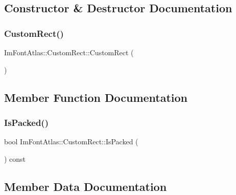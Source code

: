 \subsection{Constructor \& Destructor Documentation}
\hypertarget{struct_im_font_atlas_1_1_custom_rect_abee2845214da5ffc9c77bb388402a0a9}{}\label{struct_im_font_atlas_1_1_custom_rect_abee2845214da5ffc9c77bb388402a0a9} 
\subsubsection{\texorpdfstring{Custom\+Rect()}{CustomRect()}}
{\footnotesize\ttfamily Im\+Font\+Atlas\+::\+Custom\+Rect\+::\+Custom\+Rect (\begin{DoxyParamCaption}{ }\end{DoxyParamCaption})}



\subsection{Member Function Documentation}
\hypertarget{struct_im_font_atlas_1_1_custom_rect_ac15602342c8eabbddf559bc84a3e6700}{}\label{struct_im_font_atlas_1_1_custom_rect_ac15602342c8eabbddf559bc84a3e6700} 
\subsubsection{\texorpdfstring{Is\+Packed()}{IsPacked()}}
{\footnotesize\ttfamily bool Im\+Font\+Atlas\+::\+Custom\+Rect\+::\+Is\+Packed (\begin{DoxyParamCaption}{ }\end{DoxyParamCaption}) const}



\subsection{Member Data Documentation}
\hypertarget{struct_im_font_atlas_1_1_custom_rect_aeffa65b37c8d9241e3720472a019aad2}{}\label{struct_im_font_atlas_1_1_custom_rect_aeffa65b37c8d9241e3720472a019aad2} 
